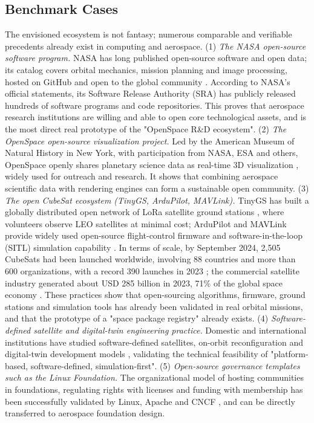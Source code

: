 \documentclass[11pt]{article}
\begin{document}
\subsection{Benchmark Cases}
The envisioned ecosystem is not fantasy; numerous comparable and verifiable precedents already exist in computing and aerospace. (1) \emph{The NASA open-source software program.} NASA has long published open-source software and open data; its catalog covers orbital mechanics, mission planning and image processing, hosted on GitHub and open to the global community \cite{nasa}. According to NASA's official statements, its Software Release Authority (SRA) has publicly released hundreds of software programs and code repositories. This proves that aerospace research institutions are willing and able to open core technological assets, and is the most direct real prototype of the "OpenSpace R\&D ecosystem". (2) \emph{The OpenSpace open-source visualization project.} Led by the American Museum of Natural History in New York, with participation from NASA, ESA and others, OpenSpace openly shares planetary science data as real-time 3D visualization \cite{openspace}, widely used for outreach and research. It shows that combining aerospace scientific data with rendering engines can form a sustainable open community. (3) \emph{The open CubeSat ecosystem (TinyGS, ArduPilot, MAVLink).} TinyGS has built a globally distributed open network of LoRa satellite ground stations \cite{tinygs}, where volunteers observe LEO satellites at minimal cost; ArduPilot and MAVLink provide widely used open-source flight-control firmware and software-in-the-loop (SITL) simulation capability \cite{ardupilot,mavlink}. In terms of scale, by September 2024, 2,505 CubeSats had been launched worldwide, involving 88 countries and more than 600 organizations, with a record 390 launches in 2023 \cite{kulu2024}; the commercial satellite industry generated about USD 285 billion in 2023, 71\% of the global space economy \cite{sia2024}. These practices show that open-sourcing algorithms, firmware, ground stations and simulation tools has already been validated in real orbital missions, and that the prototype of a "space package registry" already exists. (4) \emph{Software-defined satellite and digital-twin engineering practice.} Domestic and international institutions have studied software-defined satellites, on-orbit reconfiguration and digital-twin development models \cite{xufanjiang2023}, validating the technical feasibility of "platform-based, software-defined, simulation-first". (5) \emph{Open-source governance templates such as the Linux Foundation.} The organizational model of hosting communities in foundations, regulating rights with licenses and funding with membership has been successfully validated by Linux, Apache and CNCF \cite{fogel2005}, and can be directly transferred to aerospace foundation design.
\end{document}
